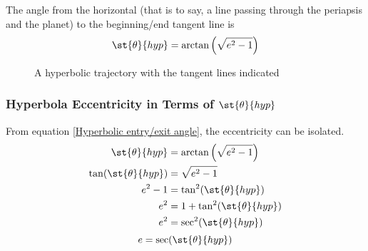 \documentclass[../basicOrbitalDynamics.tex]{subfiles}
\begin{document}
The angle from the horizontal (that is to say, a line passing through the periapsis and the planet) to the beginning/end tangent line is
\begin{equation}\label{Hyperbolic entry/exit angle}
    \st{\theta}{hyp}=\arctan\left(\sqrt{e^2-1}\right)
\end{equation}

\begin{figure}[H]
    \centering
    \caption{A hyperbolic trajectory with the tangent lines indicated}\label{Hyperbola with angles}
\end{figure}

\subsubsection{Hyperbola Eccentricity in Terms of \texorpdfstring{$\st{\theta}{hyp}$}{Theta Hyperbolic}}

From equation \eqref{Hyperbolic entry/exit angle}, the eccentricity can be isolated.
\begin{align*}
    \st{\theta}{hyp}       & =\arctan\left(\sqrt{e^2-1}\right) \\
    \tan(\st{\theta}{hyp}) & =\sqrt{e^2-1}                     \\
    e^2-1                   & =\tan^2(\st{\theta}{hyp})        \\
    e^2                     & =1+\tan^2(\st{\theta}{hyp})      \\
    e^2                     & =\sec^2(\st{\theta}{hyp})        \\
\end{align*}
\begin{equation}\label{Hyperbola Eccentricity}
    e=\sec(\st{\theta}{hyp})
\end{equation}
\end{document}
